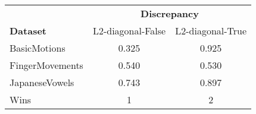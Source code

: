 \begin{tabular}{lcc}
\toprule
& \multicolumn{4}{c}{\textbf{Discrepancy}} \\
\textbf{Dataset} &  L2-diagonal-False &  L2-diagonal-True \\
\midrule
BasicMotions    &              0.325 &             0.925 \\
FingerMovements &              0.540 &             0.530 \\
JapaneseVowels  &              0.743 &             0.897 \\ 
\midrule
Wins &                  1 &                 2 \\
\bottomrule
\end{tabular}
